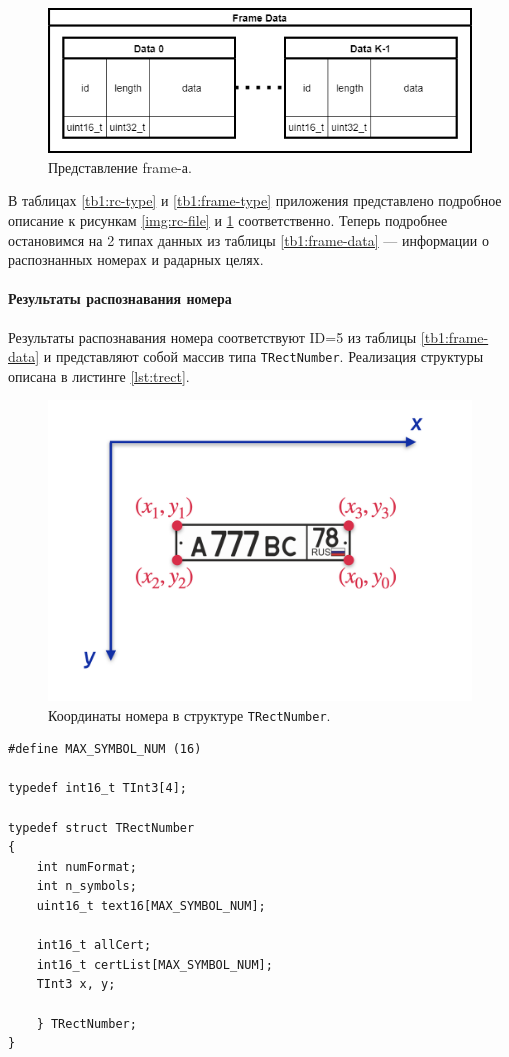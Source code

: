 \documentclass[specification,annotation,times]{itmo-student-thesis}
\begin{document}
\begin{figure}[!ht]
	\caption{Представление frame-а.}\label{img:frame-data}
	\includegraphics[width=0.85\linewidth]{../png/frame_data.png}
	\centering
\end{figure}

В таблицах \ref{tb1:rc-type} и \ref{tb1:frame-type} приложения представлено подробное описание к рисункам \ref{img:rc-file} и \ref{img:frame-data} соответственно. Теперь подробнее остановимся на 2 типах данных из таблицы \ref{tb1:frame-data} --- информации о распознанных номерах и радарных целях.

\paragraph{Результаты распознавания номера}
Результаты распознавания номера соответствуют ID=5 из таблицы \ref{tb1:frame-data} и представляют собой массив типа \texttt{TRectNumber}. Реализация структуры описана в листинге \ref{lst:trect}.

\begin{figure}[!ht]
	\caption{Координаты номера в структуре \texttt{TRectNumber}.}\label{img:licnum-recog-ind}
	\includegraphics[width=0.85\linewidth]{../png/licnum_recog_coords.png}
	\centering
\end{figure}

\begin{lstlisting}[float=!h,caption={Реализация структуры \texttt{TRectNumber}.},label={lst:trect}]
#define	MAX_SYMBOL_NUM (16)

typedef int16_t TInt3[4];

typedef struct TRectNumber
{
	int numFormat;
	int n_symbols;
	uint16_t text16[MAX_SYMBOL_NUM];

	int16_t allCert;
	int16_t certList[MAX_SYMBOL_NUM];
	TInt3 x, y;

	} TRectNumber;
}
\end{lstlisting}
\end{document}
